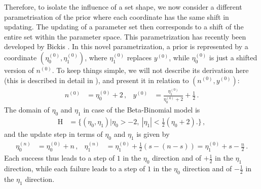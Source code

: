 \documentclass[runningheads,a4paper]{llncs}
\newcommand{\uz}{^{(0)}} %
\newcommand{\un}{^{(n)}} %
\def\yz{y\uz}
\def\nz{n\uz}
\def\Eta{\mathrm{H}}
\def\ezz{\eta_0\uz}
\def\eoz{\eta_1\uz}
\begin{document}
Therefore, to isolate the influence of a set shape,
we now consider a different parametrisation of the prior
where each coordinate has the same shift in updating.
The updating of a parameter set
then corresponds to a shift of the entire set within the parameter space.
This parametrization has recently been developed by Bickis \cite{2015:mik-isipta}. %
In this novel parametrization, a prior is represented by a coordinate $(\ezz,\eoz)$,
where $\eoz$ replaces $\yz$, while $\ezz$ is just a shifted version of $\nz$.
To keep things simple, we will not describe its derivation here (this is described in detail in \cite{2015:mik-isipta}),
and present it in relation to $(\nz, \yz)$:
\begin{align}
\label{eq:trafotony}
\nz &= \ezz + 2\,, &
\yz &= \frac{\eoz}{\ezz + 2} + \frac{1}{2}\,.
\end{align}
The domain of $\eta_0$ and $\eta_1$ in case of the Beta-Binomial model is
\begin{align}
\label{eq:eta-domain}
\Eta &= \Big\{ (\eta_0,\eta_1) \Big| \eta_0 > -2,\ |\eta_1| < \frac{1}{2}(\eta_0 + 2) \Big.\Big\}\,,
\end{align}
and the update step in terms of $\eta_0$ and $\eta_1$ is given by
\begin{equation}
\label{eq:eta-update}
\begin{aligned}
\eta_0\un &= \eta_0\uz + n\,, & 
\eta_1\un &= \eta_1\uz + \frac{1}{2}(s - (n-s)) = \eta_1\uz + s - \frac{n}{2}\,.
\end{aligned}
\end{equation}
Each success thus
leads to a step of $1$ in the $\eta_0$ direction and of $+\frac{1}{2}$ in the $\eta_1$ direction,
while each failure
leads to a step of $1$ in the $\eta_0$ direction and of $-\frac{1}{2}$ in the $\eta_1$ direction. %
\end{document}
